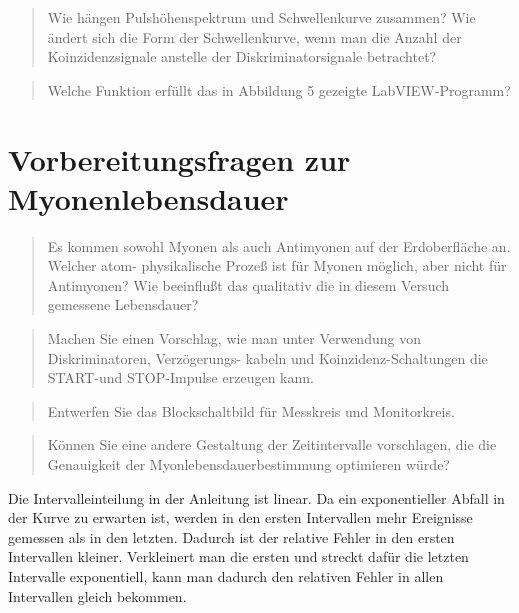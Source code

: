 \documentclass[11pt, ngerman, fleqn, DIV=15, headinclude, BCOR=2cm]{scrreprt}
\begin{document}

\begin{quote}
    Wie hängen Pulshöhenspektrum und Schwellenkurve zusammen? Wie ändert sich
    die Form der Schwellenkurve, wenn man die Anzahl der Koinzidenzsignale
    anstelle der Diskriminatorsignale betrachtet?
\end{quote}


\begin{quote}
    Welche Funktion erfüllt das in Abbildung 5 gezeigte LabVIEW-Programm?
\end{quote}


\section{Vorbereitungsfragen zur Myonenlebensdauer}

\parencite[14]{physik512-Anleitung}

\begin{quote}
    Es kommen sowohl Myonen als auch Antimyonen auf der Erdoberfläche an.
    Welcher atom- physikalische Prozeß ist für Myonen möglich, aber nicht für
    Antimyonen? Wie beeinflußt das qualitativ die in diesem Versuch gemessene
    Lebensdauer?
\end{quote}


\begin{quote}
    Machen Sie einen Vorschlag, wie man unter Verwendung von Diskriminatoren,
    Verzögerungs- kabeln und Koinzidenz-Schaltungen die START-und STOP-Impulse
    erzeugen kann.
\end{quote}


\begin{quote}
    Entwerfen Sie das Blockschaltbild für Messkreis und Monitorkreis.
\end{quote}


\begin{quote}
    Können Sie eine andere Gestaltung der Zeitintervalle vorschlagen, die die
    Genauigkeit der Myonlebensdauerbestimmung optimieren würde?
\end{quote}

Die Intervalleinteilung in der Anleitung ist linear. Da ein exponentieller
Abfall in der Kurve zu erwarten ist, werden in den ersten Intervallen mehr
Ereignisse gemessen als in den letzten. Dadurch ist der relative Fehler in den
ersten Intervallen kleiner. Verkleinert man die ersten und streckt dafür die
letzten Intervalle exponentiell, kann man dadurch den relativen Fehler in allen
Intervallen gleich bekommen.
\end{document}
